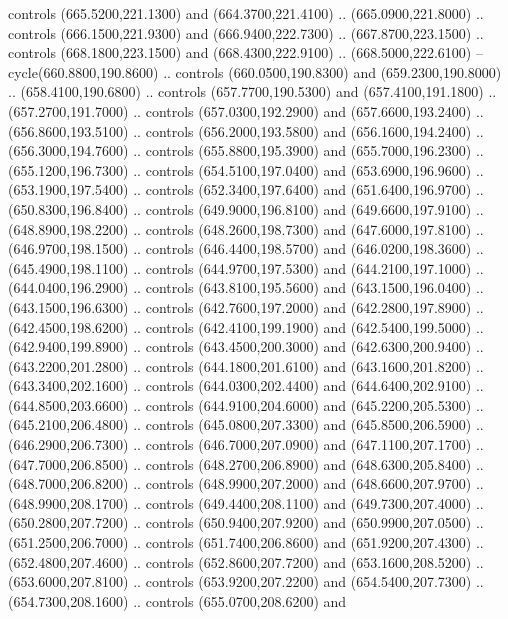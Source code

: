 {\begin{scope}[y=0.80pt, x=0.80pt, yscale=-1, xscale=1, inner sep=0pt, outer sep=0pt, #1]
      controls (665.5200,221.1300) and (664.3700,221.4100) .. (665.0900,221.8000) ..
      controls (666.1500,221.9300) and (666.9400,222.7300) .. (667.8700,223.1500) ..
      controls (668.1800,223.1500) and (668.4300,222.9100) .. (668.5000,222.6100) --
      cycle(660.8800,190.8600) .. controls (660.0500,190.8300) and
      (659.2300,190.8000) .. (658.4100,190.6800) .. controls (657.7700,190.5300) and
      (657.4100,191.1800) .. (657.2700,191.7000) .. controls (657.0300,192.2900) and
      (657.6600,193.2400) .. (656.8600,193.5100) .. controls (656.2000,193.5800) and
      (656.1600,194.2400) .. (656.3000,194.7600) .. controls (655.8800,195.3900) and
      (655.7000,196.2300) .. (655.1200,196.7300) .. controls (654.5100,197.0400) and
      (653.6900,196.9600) .. (653.1900,197.5400) .. controls (652.3400,197.6400) and
      (651.6400,196.9700) .. (650.8300,196.8400) .. controls (649.9000,196.8100) and
      (649.6600,197.9100) .. (648.8900,198.2200) .. controls (648.2600,198.7300) and
      (647.6000,197.8100) .. (646.9700,198.1500) .. controls (646.4400,198.5700) and
      (646.0200,198.3600) .. (645.4900,198.1100) .. controls (644.9700,197.5300) and
      (644.2100,197.1000) .. (644.0400,196.2900) .. controls (643.8100,195.5600) and
      (643.1500,196.0400) .. (643.1500,196.6300) .. controls (642.7600,197.2000) and
      (642.2800,197.8900) .. (642.4500,198.6200) .. controls (642.4100,199.1900) and
      (642.5400,199.5000) .. (642.9400,199.8900) .. controls (643.4500,200.3000) and
      (642.6300,200.9400) .. (643.2200,201.2800) .. controls (644.1800,201.6100) and
      (643.1600,201.8200) .. (643.3400,202.1600) .. controls (644.0300,202.4400) and
      (644.6400,202.9100) .. (644.8500,203.6600) .. controls (644.9100,204.6000) and
      (645.2200,205.5300) .. (645.2100,206.4800) .. controls (645.0800,207.3300) and
      (645.8500,206.5900) .. (646.2900,206.7300) .. controls (646.7000,207.0900) and
      (647.1100,207.1700) .. (647.7000,206.8500) .. controls (648.2700,206.8900) and
      (648.6300,205.8400) .. (648.7000,206.8200) .. controls (648.9900,207.2000) and
      (648.6600,207.9700) .. (648.9900,208.1700) .. controls (649.4400,208.1100) and
      (649.7300,207.4000) .. (650.2800,207.7200) .. controls (650.9400,207.9200) and
      (650.9900,207.0500) .. (651.2500,206.7000) .. controls (651.7400,206.8600) and
      (651.9200,207.4300) .. (652.4800,207.4600) .. controls (652.8600,207.7200) and
      (653.1600,208.5200) .. (653.6000,207.8100) .. controls (653.9200,207.2200) and
      (654.5400,207.7300) .. (654.7300,208.1600) .. controls (655.0700,208.6200) and

\end{scope}}
